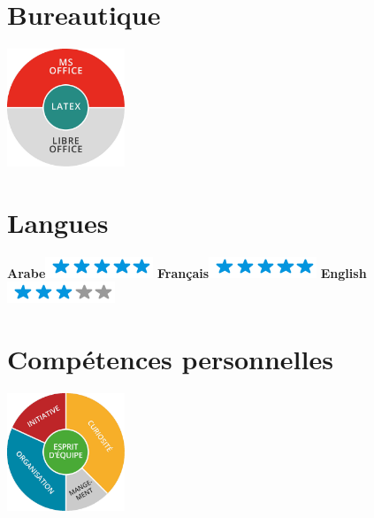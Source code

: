 \documentclass[]{friggeri-cv}
\begin{document}
\begin{aside}
~
~
~
~
  \section{Bureautique}
    \includegraphics[width=100pt]{img/bureautique.jpg}
    ~
    ~
  \section{Langues}
    \textbf{Arabe}\includegraphics[scale=0.40]{img/5stars.png}
    \textbf{Français}\includegraphics[scale=0.40]{img/5stars.png}
    \textbf{English}\includegraphics[scale=0.40]{img/3stars.png}
    ~
    ~
  \section{Compétences personnelles}
    \includegraphics[width=100pt]{img/personnel.jpg}
    ~
\end{aside}
\end{document}
